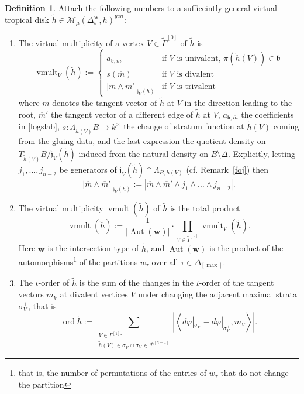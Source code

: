 \documentclass[11pt,letter]{amsart}
\theoremstyle{definition}
\newtheorem{definition}[theorem]{Definition}
\theoremstyle{remark}
\numberwithin{equation}{section}
\numberwithin{figure}{section}
\newcommand{\Cover}{\Delta^{\mathbf w}_{s} }
\newcommand{\effvert}{\widetilde \Gamma^{[0]}}
\newcommand {\fob}  {\mathfrak{b}}
\newcommand {\foj}  {\mathfrak{j}}
\newcommand {\Aut}  {\operatorname{Aut}}
\newcommand {\M} {\mathcal{M}}
\renewcommand {\max} {{\operatorname{max}}}
\newcommand {\ord}  {\operatorname{ord}}
\renewcommand{\P}  {\mathscr{P}}
\newcommand {\vmult} {\operatorname{vmult}}
\begin{document}
\begin{definition} 
Attach the following numbers to a sufficeintly general virtual tropical disk
$\tilde h \in \M_\mu(\Cover,h)^{gen} $:
\begin{enumerate}
\item
The virtual multiplicity of a vertex $V\in\effvert$ of $\tilde h $ is
\[
\vmult_V(\tilde h):=\left\{ \begin{array}{ll} a_{\fob, \overline m}   
& \text{if $V$ is univalent, $\pi (\tilde h(V)) \in \fob  $}\\
s(\overline m) &  \text{if $V$ is divalent } \\
\big|\overline m \wedge \overline m'\big|_{\foj_V(h)}
& \text{if $V$ is trivalent} \end{array}\right.
\]
where $\overline m$ denotes the tangent vector of $\tilde h$ at $V$ in the
direction leading to the root, $\overline m'$ the tangent vector of a different
edge of $\tilde h$ at $V$, $a_{\fob,\overline m}$ the coefficients in
\eqref{logslab}, $s: \Lambda_{\tilde h(V)}B \to k^\times$ the change of stratum
function at $\tilde h(V)$ coming from the gluing data, and the last expression
the quotient density on $T_{\tilde h(V)}B/\foj_V(\tilde h)$ induced from the
natural density on $B\setminus \Delta$. Explicitly, letting $\overline j_1,
\ldots,\overline j_{n-2}$ be generators of $ \foj_V(\tilde h) \cap
\Lambda_{B,h(V)} $ (cf. Remark~\ref{foj}) then
\[
\big|\overline m \wedge \overline m'\big|_{\foj_V(h)}
:= |\overline m\wedge \overline m' \wedge \overline j_1 \wedge
\ldots \wedge \overline j_{n-2}|.
\]
\item 
The virtual multiplicity $\vmult(\tilde h)$ of $\tilde h$ is the total product
\[
\vmult(\tilde h):=\frac{1}{|\Aut(\mathbf w)|} \cdot
\prod_{V \in \effvert } \vmult_{V}(\tilde h).
\]
Here $\mathbf w$ is the intersection type of $\tilde h$, and $\Aut(\mathbf
w)$ is the product of the automorphisms\footnote{that is, the number of
permutations of the entries of $w_\tau$ that do not change the partition } of
the partitions $w_\tau$ over all $\tau \in \Delta_{[\max]}$.
\item 
The $t$-order of $\tilde h$ is the sum of the changes in the $t$-order of the
tangent vectors $\overline m_V$ at divalent vertices $V$ under changing the
adjacent maximal strata $\sigma^\pm_V$, that is
\[
\ord \tilde h := \sum _{\substack{V\in \Gamma^{[1]}:\\  \tilde h(V)
\in \sigma^+_V\cap \sigma^-_V \in \P^{[n-1]} } } \left|\left<
d\varphi|_{\sigma^-_V} - d\varphi|_{\sigma^+_V}, \overline
m_V\right>\right|.
\]
\end{enumerate}
\end{definition}
\end{document}
